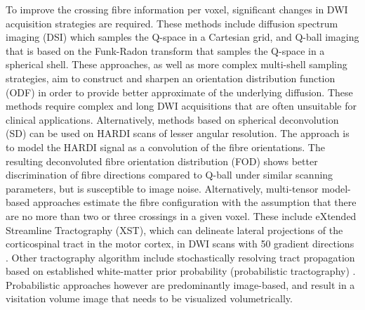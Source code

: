 To improve the crossing fibre information per voxel, significant changes in DWI acquisition strategies are required. These methods include diffusion spectrum imaging (DSI)\cite{Wedeen2005,Wedeen2008} which samples the Q-space in a Cartesian grid, and Q-ball imaging that is based on the Funk-Radon transform \cite{Cho2008,Descoteaux2007a} that samples the Q-space in a spherical shell. These approaches, as well as more complex multi-shell sampling strategies, aim to construct and sharpen an orientation distribution function (ODF) in order to provide better approximate of the underlying diffusion. These methods require complex and long DWI acquisitions that are often unsuitable for clinical applications. Alternatively, methods based on spherical deconvolution (SD) can be used on HARDI scans of lesser angular resolution. The approach is to model the HARDI signal as a convolution of the fibre orientations. The resulting deconvoluted fibre orientation distribution (FOD) shows better discrimination of fibre directions compared to Q-ball under similar scanning parameters, but is susceptible to image noise\cite{Anderson2005,DellAcqua2007,Tournier2004}. Alternatively, multi-tensor model-based approaches estimate the fibre configuration with the assumption that there are no more than two or three crossings in a given voxel. These include eXtended Streamline Tractography (XST), which can delineate lateral projections of the corticospinal tract in the motor cortex, in DWI scans with 50 gradient directions \cite{Qazi2009}. Other tractography algorithm include stochastically resolving tract propagation based on established white-matter prior probability (probabilistic tractography) \cite{Behrens2007}. Probabilistic approaches however are predominantly image-based, and result in a visitation volume image that needs to be visualized volumetrically. 


